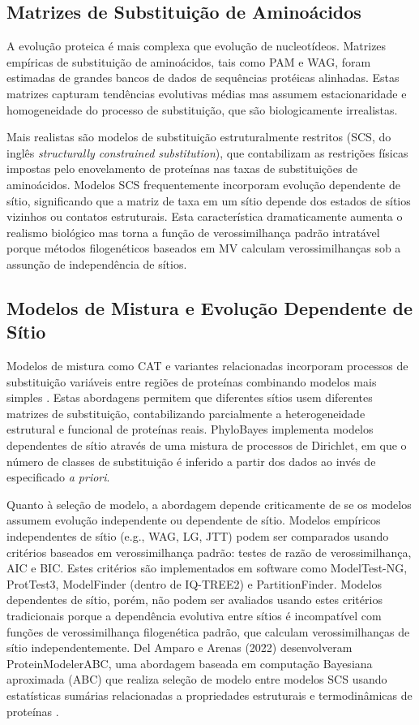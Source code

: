 \subsection{Matrizes de Substituição de Aminoácidos}

A evolução proteica é mais complexa que evolução de nucleotídeos. Matrizes empíricas de substituição de aminoácidos, tais como PAM e WAG, foram estimadas de grandes bancos de dados de sequências protéicas alinhadas. Estas matrizes capturam tendências evolutivas médias mas assumem estacionaridade e homogeneidade do processo de substituição, que são biologicamente irrealistas.

Mais realistas são modelos de substituição estruturalmente restritos (SCS, do inglês \textit{structurally constrained substitution}), que contabilizam as restrições físicas impostas pelo enovelamento de proteínas nas taxas de substituições de aminoácidos. Modelos SCS frequentemente incorporam evolução dependente de sítio, significando que a matriz de taxa em um sítio depende dos estados de sítios vizinhos ou contatos estruturais. Esta característica dramaticamente aumenta o realismo biológico mas torna a função de verossimilhança padrão intratável porque métodos filogenéticos baseados em MV calculam verossimilhanças sob a assunção de independência de sítios.

\subsection{Modelos de Mistura e Evolução Dependente de Sítio}

Modelos de mistura como CAT e variantes relacionadas incorporam processos de substituição variáveis entre regiões de proteínas combinando modelos mais simples \parencite{lartillot2004}. Estas abordagens permitem que diferentes sítios usem diferentes matrizes de substituição, contabilizando parcialmente a heterogeneidade estrutural e funcional de proteínas reais. PhyloBayes implementa modelos dependentes de sítio através de uma mistura de processos de Dirichlet, em que o número de classes de substituição é inferido a partir dos dados ao invés de especificado \textit{a priori}.

Quanto à seleção de modelo, a abordagem depende criticamente de se os modelos assumem evolução independente ou dependente de sítio. Modelos empíricos independentes de sítio (e.g., WAG, LG, JTT) podem ser comparados usando critérios baseados em verossimilhança padrão: testes de razão de verossimilhança, AIC e BIC. Estes critérios são implementados em software como ModelTest-NG, ProtTest3, ModelFinder (dentro de IQ-TREE2) e PartitionFinder. Modelos dependentes de sítio, porém, não podem ser avaliados usando estes critérios tradicionais porque a dependência evolutiva entre sítios é incompatível com funções de verossimilhança filogenética padrão, que calculam verossimilhanças de sítio independentemente. Del Amparo e Arenas (2022) desenvolveram ProteinModelerABC, uma abordagem baseada em computação Bayesiana aproximada (ABC) que realiza seleção de modelo entre modelos SCS usando estatísticas sumárias relacionadas a propriedades estruturais e termodinâmicas de proteínas \parencite{delamparo2022}.

